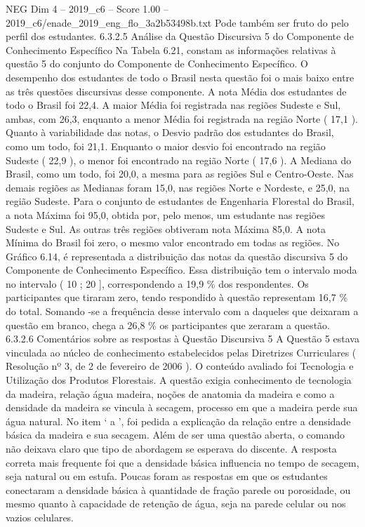 \begin{textsample}{NEG Dim 4 – 2019\_c6 – Score 1.00 – 2019\_c6/enade\_2019\_eng\_flo\_3a2b53498b.txt}
Pode também ser fruto do pelo perfil dos estudantes. 6.3.2.5 Análise da Questão Discursiva 5 do Componente de Conhecimento Específico Na Tabela 6.21, constam as informações relativas à questão 5 do conjunto do Componente de Conhecimento Específico.
O desempenho dos estudantes de todo o Brasil nesta questão foi o mais baixo entre as três questões discursivas desse componente.
A nota Média dos estudantes de todo o Brasil foi 22,4.
A maior Média foi registrada nas regiões Sudeste e Sul, ambas, com 26,3, enquanto a menor Média foi registrada na região Norte ( 17,1 ).
Quanto à variabilidade das notas, o Desvio padrão dos estudantes do Brasil, como um todo, foi 21,1.
Enquanto o maior desvio foi encontrado na região Sudeste ( 22,9 ), o menor foi encontrado na região Norte ( 17,6 ).
A Mediana do Brasil, como um todo, foi 20,0, a mesma para as regiões Sul e Centro-Oeste.
Nas demais regiões as Medianas foram 15,0, nas regiões Norte e Nordeste, e 25,0, na região Sudeste.
Para o conjunto de estudantes de Engenharia Florestal do Brasil, a nota Máxima foi 95,0, obtida por, pelo menos, um estudante nas regiões Sudeste e Sul.
As outras três regiões obtiveram nota Máxima 85,0.
A nota Mínima do Brasil foi zero, o mesmo valor encontrado em todas as regiões.
No Gráfico 6.14, é representada a distribuição das notas da questão discursiva 5 do Componente de Conhecimento Específico.
Essa distribuição tem o intervalo moda no intervalo ( 10 ; 20 ], correspondendo a 19,9 \% dos respondentes.
Os participantes que tiraram zero, tendo respondido à questão representam 16,7 \% do total.
Somando -se a frequência desse intervalo com a daqueles que deixaram a questão em branco, chega a 26,8 \% os participantes que zeraram a questão. 6.3.2.6 Comentários sobre as respostas à Questão Discursiva 5 A Questão 5 estava vinculada ao núcleo de conhecimento estabelecidos pelas Diretrizes Curriculares ( Resolução nº 3, de 2 de fevereiro de 2006 ).
O conteúdo avaliado foi Tecnologia e Utilização dos Produtos Florestais.
A questão exigia conhecimento de tecnologia da madeira, relação água madeira, noções de anatomia da madeira e como a densidade da madeira se vincula à secagem, processo em que a madeira perde sua água natural.
No item ‘ a ’, foi pedida a explicação da relação entre a densidade básica da madeira e sua secagem.
Além de ser uma questão aberta, o comando não deixava claro que tipo de abordagem se esperava do discente.
A resposta correta mais frequente foi que a densidade básica influencia no tempo de secagem, seja natural ou em estufa.
Poucas foram as respostas em que os estudantes conectaram a densidade básica à quantidade de fração parede ou porosidade, ou mesmo quanto à capacidade de retenção de água, seja na parede celular ou nos vazios celulares.

\end{textsample}
